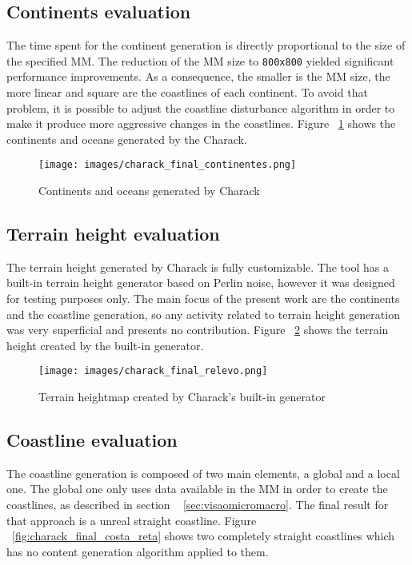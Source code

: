 \documentclass[10pt, conference, compsocconf]{IEEEtran}
\begin{document}
\subsection{Continents evaluation}

The time spent for the continent generation is directly proportional to the size of the specified MM. The reduction of the MM size to {\tt 800x800} yielded significant performance improvements. As a consequence, the smaller is the MM size, the more linear and square are the coastlines of each continent. To avoid that problem, it is possible to adjust the coastline disturbance algorithm in order to make it produce more aggressive changes in the coastlines. Figure ~\ref{fig:charack_final_continentes} shows the continents and oceans generated by the Charack.

\begin{figure}
\centering
\texttt{[image: images/charack\_final\_continentes.png]}
\caption{Continents and oceans generated by Charack}
\label{fig:charack_final_continentes}
\end{figure}


\subsection{Terrain height evaluation}

The terrain height generated by Charack is fully customizable. The tool has a built-in terrain height generator based on Perlin noise, however it was designed for testing purposes only. The main focus of the present work are the continents and the coastline generation, so any activity related to terrain height generation was very superficial and presents no contribution. Figure ~\ref{fig:charack_final_relevo} shows the terrain height created by the built-in generator.

\begin{figure}
\centering
\texttt{[image: images/charack\_final\_relevo.png]}
\caption{Terrain heightmap created by Charack's built-in generator}
\label{fig:charack_final_relevo}
\end{figure}

\subsection{Coastline evaluation}

The coastline generation is composed of two main elements, a global and a local one. The global one only uses data available in the MM in order to create the coastlines, as described in section ~ \ref{sec:visaomicromacro}. The final result for that approach is a unreal straight coastline. Figure ~\ref{fig:charack_final_costa_reta} shows two completely straight coastlines which has no content generation algorithm applied to them. 
\end{document}
